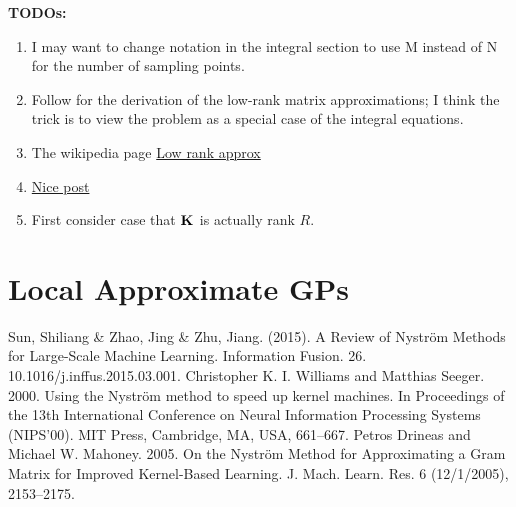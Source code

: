 \documentclass[12pt]{article}
\begin{document}
\bigskip
\textbf{TODOs:}
\begin{enumerate}
\item I may want to change notation in the integral section to use M instead of N for the number of sampling points. 
\item Follow \cite{Williams} for the derivation of the low-rank matrix approximations; I think the trick is to view the problem as a special case of the integral equations. 
\item The wikipedia page \href{https://en.wikipedia.org/wiki/Low-rank_matrix_approximations is also good.}{Low rank approx}
\item \href{https://stats.stackexchange.com/questions/261149/nystroem-method-for-kernel-approximation}{Nice post}
\item First consider case that $\mathbf{K}_{}$ is actually rank $R$. 
\end{enumerate}


\section{Local Approximate GPs}

\begin{thebibliography}{20}
 Sun, Shiliang \& Zhao, Jing \& Zhu, Jiang. (2015). A Review of Nyström Methods for Large-Scale Machine Learning. Information Fusion. 26. 10.1016/j.inffus.2015.03.001. 
 Christopher K. I. Williams and Matthias Seeger. 2000. Using the Nyström method to speed up kernel machines. In Proceedings of the 13th International Conference on Neural Information Processing Systems (NIPS'00). MIT Press, Cambridge, MA, USA, 661–667.
 Petros Drineas and Michael W. Mahoney. 2005. On the Nyström Method for Approximating a Gram Matrix for Improved Kernel-Based Learning. J. Mach. Learn. Res. 6 (12/1/2005), 2153–2175.
\end{thebibliography}
\end{document}
